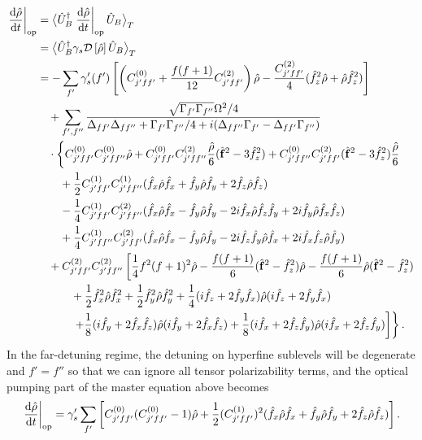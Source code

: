\documentclass[preprint,aps,pra,onecolumn,superscriptaddress]{revtex4-1} %
\newcommand{\dt}[1]{\frac{{\mathrm d} {#1}}{{\mathrm d}t}}
\newcommand{\nn}{\nonumber}
\newcommand{\expect}[1]{\big\langle #1 \big\rangle}
\newcommand{\fo}{\hat{\mathbf{f}}}
\newcommand{\fx}{\hat{f}_x}
\newcommand{\fy}{\hat{f}_y}
\newcommand{\fz}{\hat{f}_z}
\newcommand{\rhoo}{\hat{\rho}}
\begin{document}
\begin{appendix}
\begin{align}
\left. \dt{\hat{\rho}}\right|_{\rm op} &= \expect{\hat{U}_B^\dagger\left.\dt{\hat{\rho}}\right|_{\rm op}\hat{U}_B}_T\nn\\
&= \expect{\hat{U}_B^\dagger\gamma_s\mathcal{D}\left[\hat{\rho} \right]\hat{U}_B}_T\nn\\
&= - \sum_{f'} \gamma'_s(f') \left[\left(C_{j'ff'}^{(0)}+\frac{f(f+1)}{12}C_{j'ff'}^{(2)} \right)\hat{\rho}-\frac{C_{j'ff'}^{(2)}}{4}(\hat{f}_z^2\hat{\rho}+\hat{\rho}\hat{f}_z^2) \right]\nn\\
&\quad+\sum_{f',f''} \frac{\sqrt{\Gamma_{f'}\Gamma_{f''} }\Omega^2/4 }{\Delta_{ff'}\Delta_{ff''}+\Gamma_{f'}\Gamma_{f''}/4+i(\Delta_{ff''}\Gamma_{f'}-\Delta_{ff'}\Gamma_{f''} ) }\nn\\
&\quad\cdot\left\{C_{j'ff'}^{(0)}C_{j'ff''}^{(0)}\hat{\rho}+ C_{j'ff'}^{(0)}C_{j'ff''}^{(2)}\frac{\hat{\rho}}{6}(\fo^2-3\hat{f}_z^2) + C_{j'ff''}^{(0)}C_{j'ff'}^{(2)}(\fo^2-3\hat{f}_z^2)\frac{\hat{\rho}}{6} \right.\nn\\
&\quad\quad + \frac{1}{2}C_{j'ff'}^{(1)}C_{j'ff''}^{(1)}(\hat{f}_x\hat{\rho}\hat{f}_x+\hat{f}_y\hat{\rho}\hat{f}_y+2\hat{f}_z\hat{\rho}\hat{f}_z )\nn\\
&\quad\quad -\frac{1}{4}C_{j'ff'}^{(1)}C_{j'ff''}^{(2)}(\fx\rhoo\fx-\fy\rhoo\fy-2i\fx\rhoo\fz\fy+2i\fy\rhoo\fx\fz )\nn\\
&\quad\quad +\frac{1}{4}C_{j'ff''}^{(1)}C_{j'ff'}^{(2)}(\fx\rhoo\fx-\fy\rhoo\fy-2i\fz\fy\rhoo\fx+2i\fx\fz\rhoo\fy ) \nn\\
&\quad +C_{j'ff'}^{(2)}C_{j'ff''}^{(2)}\left[\frac{1}{4}f^2(f+1)^2\rhoo-\frac{f(f+1)}{6}(\fo^2-\fz^2)\rhoo-\frac{f(f+1)}{6}\rhoo(\fo^2-\fz^2) \right.\nn\\
&\quad\quad\quad+\frac{1}{2}\fx^2\rhoo\fx^2+\frac{1}{2}\fy^2\rhoo\fy^2+\frac{1}{4}(i\fz+2\fy\fx)\rhoo(i\fz+2\fy\fx)\nn\\
&\left.\left.\quad\quad\quad +\frac{1}{8}(i\fy+2\fx\fz)\rhoo(i\fy+2\fx\fz)+\frac{1}{8}(i\fx+2\fz\fy)\rhoo(i\fx+2\fz\fy) \right]\right\}.
\end{align}
In the far-detuning regime, the detuning on hyperfine sublevels will be degenerate and $ f'=f'' $ so that we can ignore all tensor polarizability terms, and the optical pumping part of the master equation above becomes
\begin{align}
\left.\dt{\rhoo}\right|_{\rm op} = \gamma'_s \sum_{f'} \left[C_{j'ff'}^{(0)}(C_{j'ff'}^{(0)}-1)\rhoo+\frac{1}{2}(C_{j'ff'}^{(1)})^2(\fx\rhoo\fx+\fy\rhoo\fy+2\fz\rhoo\fz ) \right].
\end{align}



\end{appendix}
\end{document}
